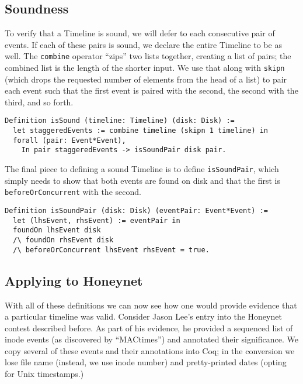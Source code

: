 \documentclass[nocopyrightspace,preprint]{sigplanconf}
\begin{document}
\subsection{Soundness}

To verify that a Timeline is sound, we will defer to each consecutive pair of
events. If each of these pairs is sound, we declare the entire Timeline to be
as well. The {\tt combine} operator ``zips'' two lists together, creating a
list of pairs; the combined list is the length of the shorter input. We use
that along with {\tt skipn} (which drops the requested number of elements from
the head of a list) to pair each event such that the first event is paired
with the second, the second with the third, and so forth.

\begin{lstlisting}
Definition isSound (timeline: Timeline) (disk: Disk) :=
  let staggeredEvents := combine timeline (skipn 1 timeline) in
  forall (pair: Event*Event),
    In pair staggeredEvents -> isSoundPair disk pair.
\end{lstlisting}

The final piece to defining a sound Timeline is to define {\tt isSoundPair},
which simply needs to show that both events are found on disk and that the
first is {\tt beforeOrConcurrent} with the second. 

\begin{lstlisting}
Definition isSoundPair (disk: Disk) (eventPair: Event*Event) :=
  let (lhsEvent, rhsEvent) := eventPair in
  foundOn lhsEvent disk
  /\ foundOn rhsEvent disk
  /\ beforeOrConcurrent lhsEvent rhsEvent = true.
\end{lstlisting}


\subsection{Applying to Honeynet}
With all of these definitions we can now see how one would provide evidence
that a particular timeline was valid. Consider Jason Lee's entry\cite{lee}
into the Honeynet contest described before. As part of his evidence, he
provided a sequenced list of inode events (as discovered by ``MACtimes'') and
annotated their significance. We copy several of these events and their
annotations into Coq; in the conversion we lose file name (instead, we use
inode number) and pretty-printed dates (opting for Unix timestamps.)
\end{document}
